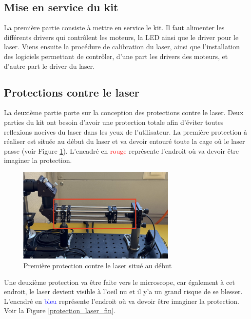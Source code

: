 \subsection{Mise en service du kit}

La première partie consiste à mettre en service le kit. Il faut alimenter les différents drivers qui contrôlent les moteurs, la LED ainsi que le driver pour le laser. Viens ensuite la procédure de calibration du laser, ainsi que l'installation des logiciels permettant de contrôler, d'une part les drivers des moteurs, et d'autre part le driver du laser.
\subsection{Protections contre le laser}
La deuxième partie porte sur la conception des protections contre le laser. Deux parties du kit ont besoin d'avoir une protection totale afin d'éviter toutes reflexions nocives du laser dans les yeux de l'utilisateur. La première protection à réaliser est située au début du laser et va devoir entouré toute la cage oû le laser passe (voir Figure \ref{protection_laser_début}). L'encadré en \textcolor{red}{rouge} représente l'endroit où va devoir être imaginer la protection.

\begin{figure}[H]
    \begin{center}
        \includegraphics[width=0.7\textwidth]{assets/figures/figures_introduction/protection_debut_laser.jpeg}
    \end{center}
    \caption{Première protection contre le laser situé au début}
    \label{protection_laser_début}
\end{figure}

Une deuxième protection va être faite vers le microscope, car également à cet endroit, le laser devient visible à l'oeil nu et il y'a un grand risque de se blesser. L'encadré en \textcolor{blue}{bleu} représente l'endroit où va devoir être imaginer la protection. Voir la Figure \ref{protection_laser_fin}.

